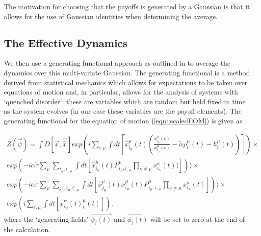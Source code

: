 \documentclass[sigconf,anonymous]{aamas}
\newcommand{\xmu}[2]{x_{#1_#2}^{#2}(t)}
\newcommand{\payoff}[2]{P^{#2}_{#1_#2, #1_{-#2}}}
\newcommand{\dxmu}[1]{\dot{x}_{#1_\mu}^{\mu} (t)}
\newcommand{\hxmu}[1]{\hat{x}_{#1_\mu}^{\mu} (t)}
\newcommand{\talpha}{\tilde{\alpha}}
\newcommand{\ttau}{\tilde{\tau}}
\begin{document}
The motivation for choosing that the payoffs is generated by a
Gaussian is that it allows for the use of Gaussian identities when
determining the average.

\subsection{The Effective Dynamics}

We then use a generating functional approach as outlined in
\cite{Mezard1986} to average the dynamics over this multi-variate
Gaussian. The generating functional is a method derived from
statistical mechanics which allows for expectations to be taken over
equations of motion and, in particular, allows for the analysis of
systems with `quenched disorder': these are
variables which are random but held fixed in time as the system
evolves (in our case these variables are the payoff elements). The
generating functional for the equation of motion (\ref{eqn::scaledEOM}) is given as \cite{Mezard1986}

{\small
\begin{equation}
\label{eqn::separatePayoffs}
	\begin{split}
	Z(\Vec{\psi}) = \int D[\Vec{x}, \Vec{\hat{x}}] exp( i \sum_{i, \mu} \int dt [ \hxmu{i} (\frac{\dxmu{i}}{\xmu{i}{\mu}} - \talpha \rho_i^\mu (t) - h_i^\mu (t))]) \times \\ exp(-i \alpha \ttau \sum_{\mu} \sum_{i_\mu, i_{-\mu}} \int dt [\hxmu{i} \payoff{i}{\mu} \prod_{\kappa \neq \mu} \xmu{i}{\kappa} )])) 
    \times \\ exp(-i \alpha \ttau \sum_{\mu} \sum_{j_\mu, i_\mu, i_{-\mu}} \int dt [\hxmu{j}  \xmu{i}{\mu} \payoff{i}{\mu} \prod_{\kappa \neq \mu} \xmu{i}{\kappa}])) 
	\times \\ exp(i \sum_{i, \mu}
	\int dt[\xmu{i} \psi^\mu_i(t)]),
\end{split}
\end{equation}
}
where the `generating fields' \cite{Coolen2005} $\Vec{\psi_i(t)}$ and
$\Vec{\phi_i(t)}$ will be set to zero at the end of the
calculation.
\end{document}
